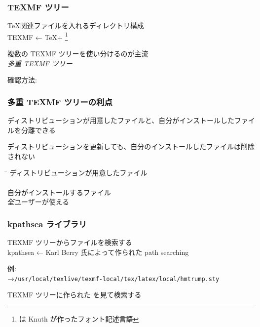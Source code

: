
\begin{frame}
	\frametitle{TEXMF ツリー}
	\TeX 関連ファイルを入れるディレクトリ構成\\
	{\footnotesize TEXMF ← \TeX + \MF\footnote{\MF は Knuth が作ったフォント記述言語}}
	
	複数の TEXMF ツリーを使い分けるのが主流\\
	\emph{多重 TEXMF ツリー}
	
	確認方法: 
\end{frame}

\begin{frame}
	\frametitle{多重 TEXMF ツリーの利点}
	ディストリビューションが用意したファイルと、自分がインストールしたファイルを分離できる
	
	ディストリビューションを更新しても、自分のインストールしたファイルは削除されない
	
	\begin{tabbing}
	\hspace*{3\zw}\=\kill
	ディストリビューションが用意したファイル\\
		\\
	自分がインストールするファイル\\
		\hspace{1\zw}\={\scriptsize 全ユーザーが使える}\\
	\end{tabbing}
\end{frame}

\begin{frame}
	\frametitle{kpathsea ライブラリ}
	TEXMF ツリーからファイルを検索する\\
	{\footnotesize kpathsea ← Karl Berry 氏によって作られた path searching}
	
	例: \\
	{\scriptsize →\texttt{/usr/local/texlive/texmf-local/tex/latex/local/hmtrump.sty}}
	
	TEXMF ツリーに作られた  を見て検索する
\end{frame}

